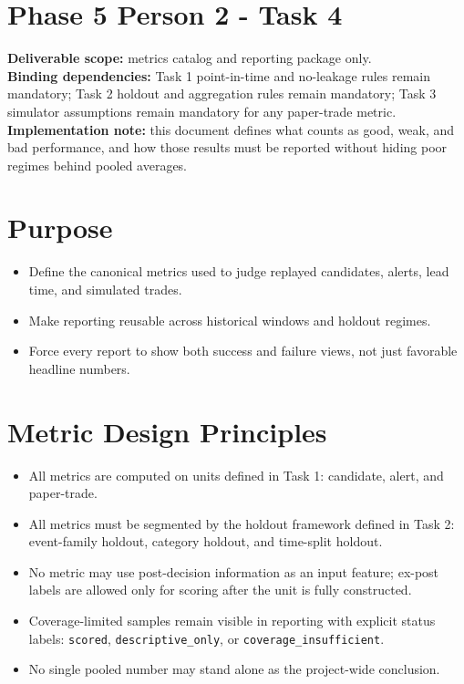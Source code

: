 \documentclass{article}
\begin{document}
\section*{Phase 5 Person 2 - Task 4}

\textbf{Deliverable scope:} metrics catalog and reporting package only.\\
\textbf{Binding dependencies:} Task 1 point-in-time and no-leakage rules remain mandatory; Task 2 holdout and aggregation rules remain mandatory; Task 3 simulator assumptions remain mandatory for any paper-trade metric.\\
\textbf{Implementation note:} this document defines what counts as good, weak, and bad performance, and how those results must be reported without hiding poor regimes behind pooled averages.

\section*{Purpose}

\begin{itemize}
\item Define the canonical metrics used to judge replayed candidates, alerts, lead time, and simulated trades.
\item Make reporting reusable across historical windows and holdout regimes.
\item Force every report to show both success and failure views, not just favorable headline numbers.
\end{itemize}

\section*{Metric Design Principles}

\begin{itemize}
\item All metrics are computed on units defined in Task 1:
candidate,
alert,
and paper-trade.
\item All metrics must be segmented by the holdout framework defined in Task 2:
event-family holdout,
category holdout,
and time-split holdout.
\item No metric may use post-decision information as an input feature; ex-post labels are allowed only for scoring after the unit is fully constructed.
\item Coverage-limited samples remain visible in reporting with explicit status labels:
\texttt{scored},
\texttt{descriptive\_only},
or \texttt{coverage\_insufficient}.
\item No single pooled number may stand alone as the project-wide conclusion.
\end{itemize}
\end{document}
